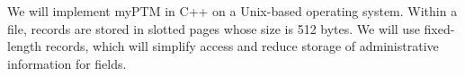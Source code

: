 We will implement myPTM in C++ on a Unix-based operating system. Within a file, records are stored in slotted pages whose size is 512 bytes. We will use fixed-length records, which will simplify access and reduce storage of administrative information for fields. 